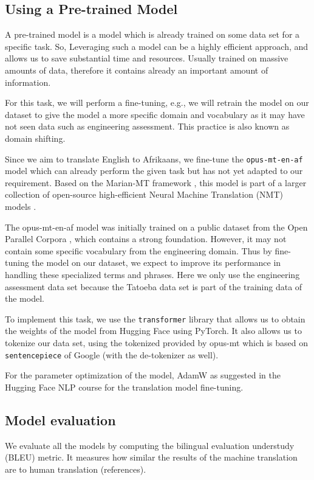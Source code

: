 \subsection{Using a Pre-trained Model}
A pre-trained model is a model which is already trained on some data set for a specific task. So, Leveraging such a model can be a highly efficient approach, and allows us to save substantial time and resources. Usually trained on massive amounts of data, therefore it contains already an important amount of information.

For this task, we will perform a fine-tuning, e.g., we will retrain the model on our dataset to give the model a more specific domain and vocabulary as it may have not seen data such as engineering assessment. This practice is also known as domain shifting.

Since we aim to translate English to Afrikaans, we fine-tune the \texttt{opus-mt-en-af} model which can already perform the given task but has not yet adapted to our requirement. Based on the Marian-MT framework \cite{marian}, this model is part of a larger collection of open-source high-efficient Neural Machine Translation (NMT) models \cite{OPUSMT}.

The opus-mt-en-af model was initially trained on a public dataset from the Open Parallel Corpora \cite{opus}, which contains a strong foundation. However, it may not contain some specific vocabulary from the engineering domain. Thus by fine-tuning the model on our dataset, we expect to improve its performance in handling these specialized terms and phrases. Here we only use the engineering assessment data set because the Tatoeba data set is part of the training data of the model.

To implement this task, we use the \texttt{transformer} library that allows us to obtain the weights of the model from Hugging Face \cite{huggingface} using PyTorch. It also allows us to tokenize our data set, using the tokenized provided by opus-mt which is based on \texttt{sentencepiece} \cite{sentencepiece} of Google (with the de-tokenizer as well).

For the parameter optimization of the model, AdamW  \cite{AdamW} as suggested in the Hugging Face NLP course for the translation model fine-tuning.

\subsection{Model evaluation}
We evaluate all the models by computing the bilingual evaluation understudy (BLEU) metric. It measures how similar the results of the machine translation are to human translation (references).

